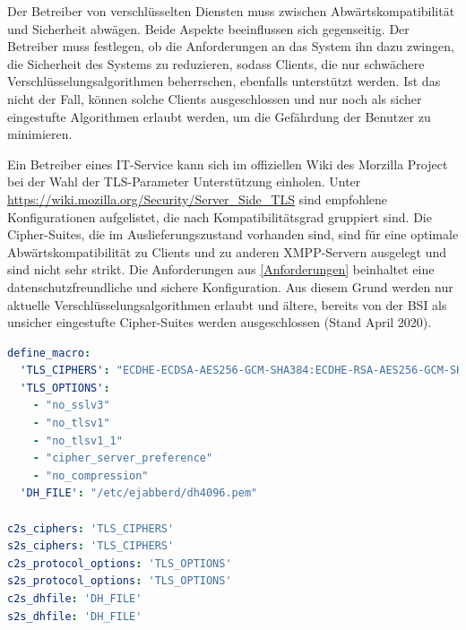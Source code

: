 \documentclass[a4paper,titlepage,halfparskip,12pt]{scrreprt}
\begin{document}
\begin{onehalfspacing}
Der Betreiber von verschlüsselten Diensten muss zwischen Abwärtskompatibilität und Sicherheit abwägen. Beide Aspekte beeinflussen sich gegenseitig. Der Betreiber muss festlegen, ob die Anforderungen an das System ihn dazu zwingen, die Sicherheit des Systems zu reduzieren, sodass Clients, die nur schwächere Verschlüsselungsalgorithmen beherrschen, ebenfalls unterstützt werden. Ist das nicht der Fall, können solche Clients ausgeschlossen und nur noch als sicher eingestufte Algorithmen erlaubt werden, um die Gefährdung der Benutzer zu minimieren.\cite{melzer2010web}

Ein Betreiber eines IT-Service kann sich im offiziellen Wiki des Morzilla Project bei der Wahl der \ac{TLS}-Parameter Unterstützung einholen. Unter \url{https://wiki.mozilla.org/Security/Server_Side_TLS} sind empfohlene Konfigurationen aufgelistet, die nach Kompatibilitätsgrad gruppiert sind.
Die Cipher-Suites, die im Auslieferungszustand vorhanden sind, sind für eine optimale Abwärtskompatibilität zu Clients und zu anderen \ac{XMPP}-Servern ausgelegt und sind nicht sehr strikt. Die Anforderungen aus \autoref{Anforderungen} beinhaltet eine datenschutzfreundliche und sichere Konfiguration. Aus diesem Grund werden nur aktuelle Verschlüsselungsalgorithmen erlaubt und ältere, bereits von der \ac{BSI} als unsicher eingestufte Cipher-Suites werden ausgeschlossen (Stand April 2020).

\bigskip

\begin{lstlisting}[language=yaml, caption={Konfiguration der \ac{TLS} Cipher Suites}, label={lst:ejabberdCipherSuites}]
define_macro:
  'TLS_CIPHERS': "ECDHE-ECDSA-AES256-GCM-SHA384:ECDHE-RSA-AES256-GCM-SHA384:ECDHE-ECDSA-CHACHA20-POLY1305:ECDHE-RSA-CHACHA20-POLY1305:ECDHE-ECDSA-AES128-GCM-SHA256:ECDHE-RSA-AES128-GCM-SHA256:ECDHE-ECDSA-AES256-SHA384:ECDHE-RSA-AES256-SHA384:ECDHE-ECDSA-AES128-SHA256:ECDHE-RSA-AES128-SHA256"
  'TLS_OPTIONS':
    - "no_sslv3"
    - "no_tlsv1"
    - "no_tlsv1_1"
    - "cipher_server_preference"
    - "no_compression"
  'DH_FILE': "/etc/ejabberd/dh4096.pem"

c2s_ciphers: 'TLS_CIPHERS'
s2s_ciphers: 'TLS_CIPHERS'
c2s_protocol_options: 'TLS_OPTIONS'
s2s_protocol_options: 'TLS_OPTIONS'
c2s_dhfile: 'DH_FILE'
s2s_dhfile: 'DH_FILE'
\end{lstlisting}


\end{onehalfspacing}
\end{document}
